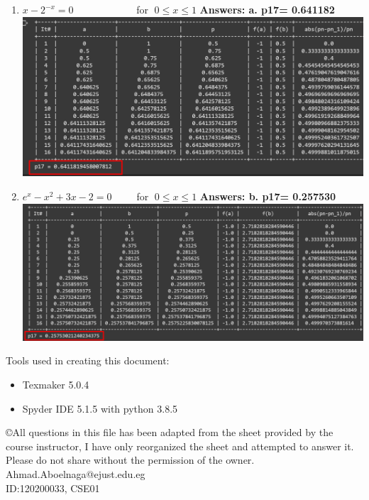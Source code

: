 \documentclass[a4paper,12pt]{article}
\begin{document}
\begin{enumerate}[label=(\alph*)]
\item $x-2^{-x} = 0 \qquad \qquad \qquad $ for $\; 0\le x \le 1$ \textbf{\quad Answers: a. p17= 0.641182}\\
\includegraphics[scale=0.79]{Q2 5.a.png}

\item $e^{x} -x^{2} + 3x -2  = 0 \, \qquad $ for $\; 0\le x \le 1$ \textbf{\quad Answers: b. p17= 0.257530}\\
\includegraphics[scale=0.72]{Q2 5.b.png}
\end{enumerate}

 Tools used in creating this document:
 \begin{itemize}
 \item Texmaker 5.0.4
 \item Spyder IDE 5.1.5 with python 3.8.5
\end{itemize}  
 
 \copyright All questions in this file has been adapted from the sheet provided by the course instructor, I have only reorganized the sheet and attempted to answer it. Please do not share without the permission of the owner.\\
\color{blue}Ahmad.Aboelnaga@ejust.edu.eg\\
ID:120200033, CSE01
 
  
\end{document}
